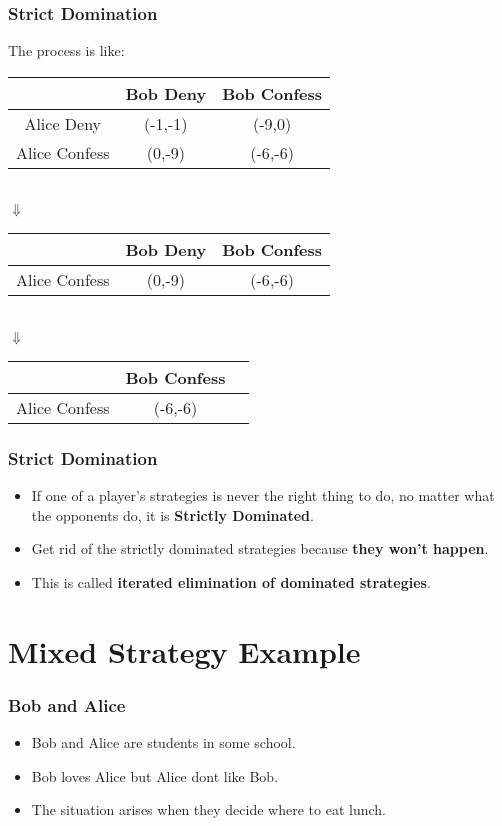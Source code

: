 \documentclass{beamer}
\begin{document}
\begin{frame}
\frametitle{Strict Domination}
The process is like:\\
\centering
\begin{tabular}{|c|c|c|}
\hline
\hline
    &{\color{red}Bob} Deny&{\color{red}Bob} Confess\\
\hline
{\color{blue}Alice} Deny& ({\color{blue}-1},{\color{red}-1}) & ({\color{blue}-9},{\color{red}0})\\
\hline
{\color{blue}Alice} Confess& ({\color{blue}0},{\color{red}-9}) & ({\color{blue}-6},{\color{red}-6})\\
\hline
\hline
\end{tabular}\\
$\Downarrow$\\
\begin{tabular}{|c|c|c|}
\hline
\hline
    &{\color{red}Bob} Deny&{\color{red}Bob} Confess\\
\hline
{\color{blue}Alice} Confess& ({\color{blue}0},{\color{red}-9}) & ({\color{blue}-6},{\color{red}-6})\\
\hline
\hline
\end{tabular}\\
$\Downarrow$\\
\begin{tabular}{|c|c|c|}
\hline
\hline
    &{\color{red}Bob} Confess\\
\hline
{\color{blue}Alice} Confess&  ({\color{blue}-6},{\color{red}-6})\\
\hline
\hline
\end{tabular}
\end{frame}

\begin{frame}
\frametitle{Strict Domination}
\begin{itemize}[<+->]
\item
If one of a player’s strategies is never the right thing to do, no matter what the opponents do, it is \textbf{Strictly Dominated}.
\item
Get rid of the strictly dominated strategies because \textbf{they won't happen}.
\item
This is called \textbf{iterated elimination of dominated strategies}.
\end{itemize}
\end{frame}


\section{Mixed Strategy Example}
\begin{frame}
\frametitle{Bob and Alice}
\begin{itemize}
\item {\color{blue}Bob} and {\color{red} Alice} are students in some school.
\item {\color{blue}Bob} loves {\color{red} Alice} but {\color{red} Alice} dont like {\color{blue}Bob}.
\item The situation arises when they decide where to eat lunch.
\end{itemize}
\end{frame}
\end{document}
